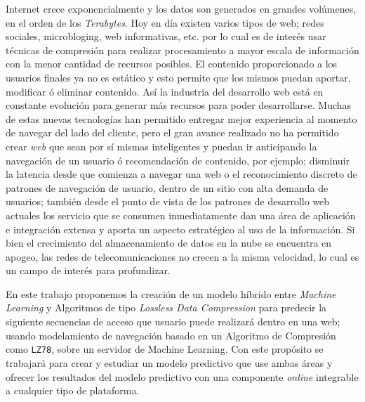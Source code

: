 
Internet crece exponencialmente  y los datos son generados en grandes volúmenes, en el orden de los \emph{Terabytes}. Hoy en día existen varios tipos de web; redes sociales, microbloging, web informativas, etc. por lo cual es de interés usar técnicas de compresión para realizar procesamiento a mayor escala de información con la menor cantidad de recursos posibles. El contenido proporcionado a los usuarios finales ya no es estático y esto permite que los mismos puedan  aportar, modificar ó eliminar contenido. Así  la industria del desarrollo web está en constante evolución para generar más recursos para poder desarrollarse. Muchas de estas nuevas tecnologías han permitido entregar mejor experiencia al momento de navegar del lado del cliente, pero el gran avance realizado no ha permitido crear \emph{web} que sean por sí mismas inteligentes y puedan ir anticipando la  navegación de un usuario ó recomendación de contenido, por ejemplo; disminuir la latencia desde que comienza a navegar una web o el reconocimiento discreto de patrones de navegación de usuario,  dentro de un sitio con alta demanda de usuarios; también desde el punto de vista de los patrones de desarrollo web actuales los servicio que se consumen inmediatamente dan una área de aplicación e integración extensa y aporta un aspecto estratégico al uso de la información. Si bien el crecimiento del almacenamiento de datos en la nube se encuentra en apogeo, las redes de telecomunicaciones  no crecen a la misma velocidad, lo cual es un campo de interés para profundizar. 

En este trabajo proponemos  la creación de un modelo híbrido entre \emph{Machine Learning} y Algoritmos de tipo \emph{Lossless Data Compression} para predecir la siguiente secuencias de acceso que usuario puede realizará dentro en una web; usando modelamiento de navegación basado en un Algoritmo de Compresión como \texttt{LZ78}, sobre un servidor de Machine Learning. Con este propósito se trabajará para crear y estudiar un modelo predictivo que use ambas áreas y  ofrecer los resultados del modelo predictivo con una componente \emph{online} integrable a cualquier tipo de plataforma.